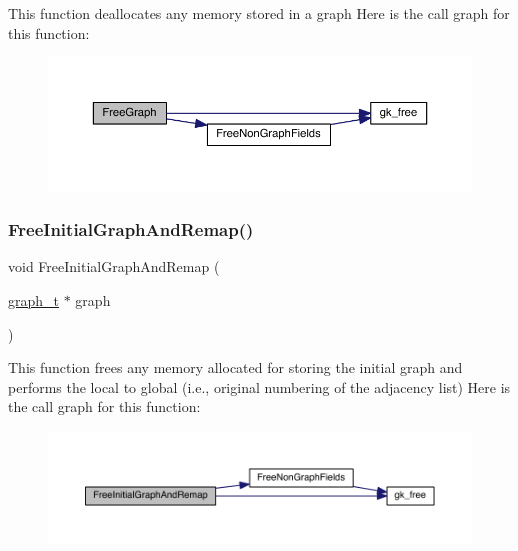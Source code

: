 This function deallocates any memory stored in a graph Here is the call graph for this function\+:\nopagebreak
\begin{figure}[H]
\begin{center}
\leavevmode
\includegraphics[width=350pt]{a00852_a583ba60fc42c1592f69587a1ae9c94d4_cgraph}
\end{center}
\end{figure}
\mbox{\label{a00852_a739360f530677f48f239c049cbbf7855}} 
\subsubsection{\texorpdfstring{Free\+Initial\+Graph\+And\+Remap()}{FreeInitialGraphAndRemap()}}
{\footnotesize\ttfamily void Free\+Initial\+Graph\+And\+Remap (\begin{DoxyParamCaption}\item[{\hyperlink{a00734}{graph\+\_\+t} $\ast$}]{graph }\end{DoxyParamCaption})}

This function frees any memory allocated for storing the initial graph and performs the local to global (i.\+e., original numbering of the adjacency list) Here is the call graph for this function\+:\nopagebreak
\begin{figure}[H]
\begin{center}
\leavevmode
\includegraphics[width=350pt]{a00852_a739360f530677f48f239c049cbbf7855_cgraph}
\end{center}
\end{figure}
\mbox{\label{a00852_a0ff13bda23f95ec19bb263ef036cd109}} 
